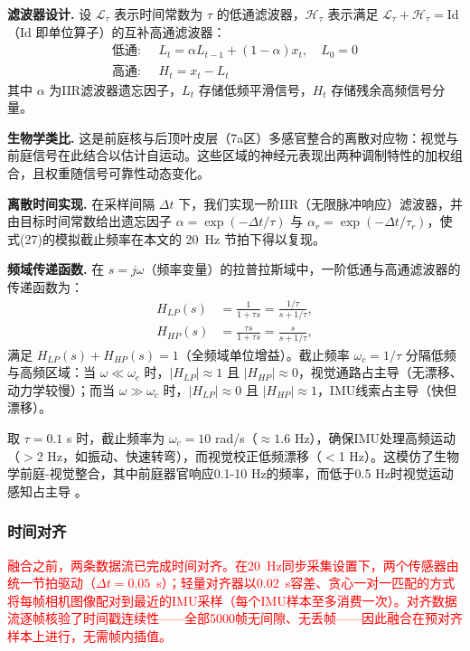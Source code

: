 \textbf{滤波器设计.} 设 $\mathcal{L}_\tau$ 表示时间常数为 $\tau$ 的低通滤波器，$\mathcal{H}_\tau$ 表示满足 $\mathcal{L}_\tau + \mathcal{H}_\tau = \mathrm{Id}$（$\mathrm{Id}$ 即单位算子）的互补高通滤波器：
\begin{align}
    \text{低通: }  & \;L_t = \alpha L_{t-1} + (1-\alpha) x_t,\quad L_0=0 \\
    \text{高通: } & \;H_t = x_t - L_t
\end{align}
其中 $\alpha$ 为IIR滤波器遗忘因子，$L_t$ 存储低频平滑信号，$H_t$ 存储残余高频信号分量。

\textbf{生物学类比.} 这是前庭核与后顶叶皮层（7a区）多感官整合的离散对应物：视觉与前庭信号在此结合以估计自运动。这些区域的神经元表现出两种调制特性的加权组合，且权重随信号可靠性动态变化。

\textbf{离散时间实现.} 在采样间隔 $\Delta t$ 下，我们实现一阶IIR（无限脉冲响应）滤波器，并由目标时间常数给出遗忘因子 $\alpha=\exp(-\Delta t/\tau)$ 与 $\alpha_r=\exp(-\Delta t/\tau_r)$，使式(27)的模拟截止频率在本文的 20~Hz 节拍下得以复现。

\textbf{频域传递函数.} 在 $s = j\omega$（频率变量）的拉普拉斯域中，一阶低通与高通滤波器的传递函数为：
\begin{align}
    H_{LP}(s) & = \frac{1}{1 + \tau s} = \frac{1/\tau}{s + 1/\tau}, \label{eq:h_lp} \\
    H_{HP}(s) & = \frac{\tau s}{1 + \tau s} = \frac{s}{s + 1/\tau}, \label{eq:h_hp}
\end{align}
满足 $H_{LP}(s) + H_{HP}(s) = 1$（全频域单位增益）。截止频率 $\omega_c = 1/\tau$ 分隔低频与高频区域：当 $\omega \ll \omega_c$ 时，$|H_{LP}| \approx 1$ 且 $|H_{HP}| \approx 0$，视觉通路占主导（无漂移、动力学较慢）；而当 $\omega \gg \omega_c$ 时，$|H_{LP}| \approx 0$ 且 $|H_{HP}| \approx 1$，IMU线索占主导（快但漂移）。

取 $\tau = 0.1$ s 时，截止频率为 $\omega_c = 10$ rad/s（$\approx 1.6$ Hz），确保IMU处理高频运动（$>$2 Hz，如振动、快速转弯），而视觉校正低频漂移（$<$1 Hz）。这模仿了生物学前庭-视觉整合，其中前庭器官响应0.1-10 Hz的频率，而低于0.5 Hz时视觉运动感知占主导 \cite{Angelaki2004}。

\subsubsection{时间对齐}

\textcolor{red}{融合之前，两条数据流已完成时间对齐。在20~Hz同步采集设置下，两个传感器由统一节拍驱动（$\Delta t = 0.05$~s）；轻量对齐器以$0.02$~s容差、贪心一对一匹配的方式将每帧相机图像配对到最近的IMU采样（每个IMU样本至多消费一次）。对齐数据流逐帧核验了时间戳连续性——全部5000帧无间隙、无丢帧——因此融合在预对齐样本上进行，无需帧内插值。}

